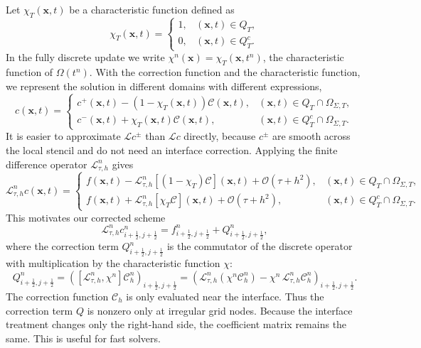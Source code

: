 \documentclass[11pt,reqno]{amsart}
\theoremstyle{plain}
\theoremstyle{definition}
\numberwithin{equation}{section}
\newcommand{\paren}[1]{\left(#1\right)}
\newcommand{\mc}[1]{\mathcal{#1}}
\newcommand{\bm}[1]{\boldsymbol{#1}}
\newcommand{\Corr}{\mathcal C}
\begin{document}
Let $\chi_T(\bm x,t)$ be a characteristic function defined as
\begin{equation}
    \chi_T(\bm x,t) =
    \begin{cases}
        1, & (\bm x,t)\in Q_T,\\
        0, & (\bm x,t)\in Q_T^c.
    \end{cases}
\end{equation}
In the fully discrete update we write $\chi^n(\bm x)=\chi_T(\bm x,t^n)$, the characteristic function of $\Omega(t^n)$.
With the correction function and the characteristic function, we represent the solution in different domains with different expressions,
\begin{equation}\label{eqn:c-rep}
    c (\bm x,t)=
    \begin{cases}
        c^+(\bm x,t) - (1-\chi_T(\bm x,t) )\Corr(\bm x,t), &  (\bm x,t)\in Q_T\cap \Omega_{\Sigma,T}, \\
        c^-(\bm x,t) + \chi_T(\bm x,t) \Corr(\bm x,t), &  (\bm x,t)\in Q_T^c\cap \Omega_{\Sigma,T}.
    \end{cases}
\end{equation}
It is easier to approximate $\mc L c^\pm$ than $\mc L c$ directly, because $c^\pm$ are smooth across the local stencil and do not need an interface correction. Applying the finite difference operator $\mc L_{\tau, h}^n$ gives
\begin{equation}
    \mc L_{\tau, h}^n c (\bm x,t)=
    \begin{cases}
        f(\bm x,t) - \mc L_{\tau, h}^n[(1-\chi_T)\Corr](\bm x,t)  +\mc O(\tau + h^2) ,&  (\bm x,t)\in Q_T\cap \Omega_{\Sigma,T}, \\
        f(\bm x,t) + \mc L_{\tau, h}^n[ \chi_T\Corr](\bm x,t)+\mc O(\tau + h^2),& (\bm x,t)\in Q_T^c\cap \Omega_{\Sigma,T}.
    \end{cases}
\end{equation}
This motivates our corrected scheme
\begin{equation}\label{eqn:corrected-scheme}
    \mc L_{\tau, h}^n c_{i+\frac12,j+\frac12}^{n} = f_{i+\frac12,j+\frac12}^{n} + Q_{i+\frac12,j+\frac12}^{n},
\end{equation}
where the correction term $Q_{i+\frac12,j+\frac12}^{n}$ is the commutator of
the discrete operator with multiplication by the characteristic function
$\chi$:
\begin{equation}
  Q_{i+\frac12,j+\frac12}^{n}
  =
  \paren{[\mc L_{\tau, h}^n,\chi^n]\Corr^{n}_h}_{i+\frac12,j+\frac12}
  =
  \paren{\mc L_{\tau, h}^n(\chi^n \Corr^{n}_h)-\chi^n\,\mc L_{\tau, h}^n\Corr^{n}_h}_{i+\frac12,j+\frac12}.
\end{equation}
The correction function $\Corr_h$ is only evaluated near the interface. Thus the correction term $Q$ is nonzero only at irregular grid nodes.
Because the interface treatment changes only the right-hand side, the coefficient matrix remains the same. This is useful for fast solvers.
\end{document}

